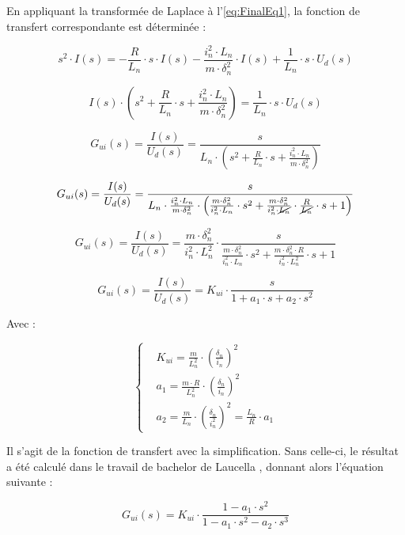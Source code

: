 En appliquant la transformée de Laplace à l'\autoref{eq:FinalEq1}, la fonction de transfert correspondante est déterminée :

$$ s^2\cdot I(s) = -\frac{R}{L_n} \cdot s\cdot I(s) - \frac{i_n^2\cdot L_n}{m \cdot\delta_n^2}\cdot I(s) + \frac{1}{L_n}\cdot s\cdot U_d(s) $$

$$ I(s)\cdot \left( s^2 + \frac{R}{L_n} \cdot s + \frac{i_n^2\cdot L_n}{m \cdot\delta_n^2}\right) = \frac{1}{L_n}\cdot s\cdot U_d(s) $$

$$ G_{ui}(s) = \frac{I(s)}{U_d(s)} = \frac{s}{L_n\cdot \left( s^2 + \frac{R}{L_n} \cdot s + \frac{i_n^2\cdot L_n}{m \cdot\delta_n^2}\right)}$$

$$ G_{ui}(s) = \frac{I(s)}{U_d(s)} = \frac{s}{L_n\cdot\frac{i_n^2\cdot L_n}{m \cdot\delta_n^2}\cdot\left(\frac{m\cdot\delta_n^2}{i_n^2\cdot L_n}\cdot s^2 + \frac{m\cdot\delta_n^2}{i_n^2\cdot \cancel{L_n}}\cdot\frac{R}{\cancel{L_n}} \cdot s + 1 \right)}$$

$$ G_{ui}(s) = \frac{I(s)}{U_d(s)} = \frac{m \cdot\delta_n^2}{i_n^2\cdot L_n^2}\cdot\frac{s}{ \frac{m\cdot\delta_n^2}{i_n^2\cdot L_n}\cdot s^2 + \frac{m\cdot\delta_n^2\cdot R}{i_n^2\cdot L_n^2} \cdot s + 1}$$

\begin{equation}
    G_{ui}(s) = \frac{I(s)}{U_d(s)} = K_{ui}\cdot\frac{s}{1 + a_1 \cdot s + a_2\cdot s^2}
\end{equation}

Avec :

\begin{equation*}
    \left\{ \begin{aligned}
         & K_{ui} = \frac{m}{L_n^2}\cdot \left(\frac{\delta_n}{i_n} \right)^2                     \\
         & a_1 = \frac{m\cdot R}{L_n^2}\cdot \left(\frac{\delta_n}{i_n} \right)^2                 \\
         & a_2 = \frac{m}{L_n}\cdot\left(\frac{\delta_n}{i_n^2}\right)^2 = \frac{L_n}{R}\cdot a_1
    \end{aligned} \right.
\end{equation*}

Il s'agit de la fonction de transfert avec la simplification. Sans celle-ci, le résultat a été calculé dans le travail de bachelor de Laucella \cite{Laucella}, donnant alors l'équation suivante :

\begin{equation}
    G_{ui}(s) = K_{ui}\cdot\frac{1-a_1 \cdot s^2}{1 - a_1 \cdot s^2 - a_2\cdot s^3}
\end{equation}

